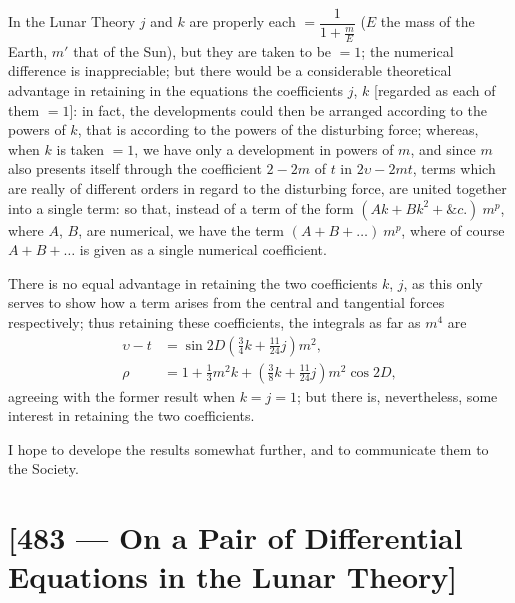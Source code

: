 \documentclass[11pt,a4paper]{article}
\theoremstyle{plain}
\theoremstyle{definition}
\theoremstyle{remark}
\begin{document}
In the Lunar Theory $j$ and $k$ are properly each $=\dfrac{1}{1+\tfrac{m}{E}}$ ($E$ the mass of the Earth, $m'$ that of the Sun), but they are taken to be $=1$; the numerical difference is inappreciable; but there would be a considerable theoretical advantage in retaining in the equations the coefficients $j$, $k$ [regarded as each of them $=1$]: in fact, the developments could then be arranged according to the powers of $k$, that is according to the powers of the disturbing force; whereas, when $k$ is taken $=1$, we have only a development in powers of $m$, and since $m$ also presents itself through the coefficient $2-2m$ of $t$ in $2\upsilon-2mt$, terms which are really of different orders in regard to the disturbing force, are united together into a single term: so that, instead of a term of the form $(Ak + Bk^{2} + \&c.)\ m^{p}$, where $A$, $B$, are numerical, we have the term $(A+B+\dots)\ m^{p}$, where of course $A+B+\dots$ is given as a single numerical coefficient.

There is no equal advantage in retaining the two coefficients $k$, $j$, as this only serves to show how a term arises from the central and tangential forces respectively; thus retaining these coefficients, the integrals as far as $m^{4}$ are
\begin{align*}
\upsilon-t &= \sin 2D\left(\tfrac34 k + \tfrac{11}{24}j\right)m^{2},\\
\rho &= 1 + \tfrac13 m^{2}k + \left(\tfrac{3}{8}k + \tfrac{11}{24}j\right)m^{2}\cos 2D,
\end{align*}
agreeing with the former result when $k=j=1$; but there is, nevertheless, some interest in retaining the two coefficients.

I hope to develope the results somewhat further, and to communicate them to the Society.


\vspace{2em}

\newpage
\section*{[483 --- On a Pair of Differential Equations in the Lunar Theory]}

\end{document}
